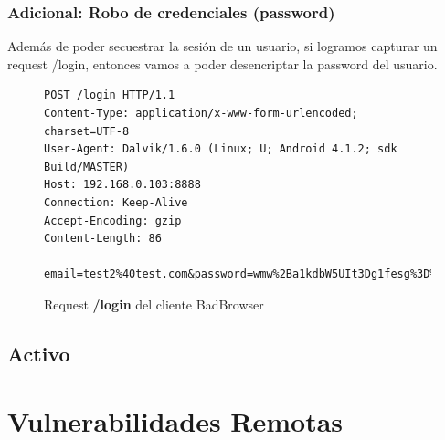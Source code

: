 \documentclass[11pt, a4paper, twoside]{article}
\begin{document}
\subsubsection{Adicional: Robo de credenciales (password)}
Además de poder secuestrar la sesión de un usuario, si logramos capturar un request /login, entonces vamos a poder desencriptar la password del usuario.

\begin{figure}[H]
\begin{Verbatim}[frame=single,fontsize=\small]
POST /login HTTP/1.1
Content-Type: application/x-www-form-urlencoded; charset=UTF-8
User-Agent: Dalvik/1.6.0 (Linux; U; Android 4.1.2; sdk Build/MASTER)
Host: 192.168.0.103:8888
Connection: Keep-Alive
Accept-Encoding: gzip
Content-Length: 86

email=test2%40test.com&password=wmw%2Ba1kdbW5UIt3Dg1fesg%3D%3D%0A&uuid=000000000000000
\end{Verbatim}
\caption{Request \textbf{\color{red}/login} del cliente BadBrowser}
\label{fig:sniffer-login}
\end{figure}

%
%
\clearpage
\subsection{Activo}

%
%
\clearpage
{}
\section{Vulnerabilidades Remotas}

\end{document}
